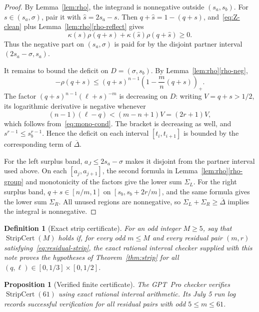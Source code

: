 \documentclass[11pt]{article}
\newtheorem{proposition}[theorem]{Proposition}
\newtheorem{definition}[theorem]{Definition}
\begin{document}
\begin{proof}
By Lemma~\ref{lem:rho}, the integrand is nonnegative outside $(s_a,s_b)$.  For $s\in(s_a,\sigma)$, pair it with $\widehat s=2s_a-s$.  Then $q+\widehat s=1-(q+s)$, and~\eqref{eq:Z-clean} plus Lemma~\ref{lem:rho}\ref{rho-reflect} gives
\[
        \kappa(s)\rho(q+s)+\kappa(\widehat s)\rho(q+\widehat s)\ge0.
\]
Thus the negative part on $(s_a,\sigma)$ is paid for by the disjoint partner interval $(2s_a-\sigma,s_a)$.

It remains to bound the deficit on $D=(\sigma,s_b)$.  By Lemma~\ref{lem:rho}\ref{rho-neg},
\[
        -\rho(q+s)\le(q+s)^{n-1}\left(1-\frac mn(q+s)\right)_+.
\]
The factor $(q+s)^{n-1}(\ell+s)^{-m}$ is decreasing on $D$: writing $V=q+s>1/2$, its logarithmic derivative is negative whenever
\[
        (n-1)(\ell-q)<(m-n+1)V=(2r+1)V,
\]
which follows from~\eqref{eq:mono-cond}.  The bracket is decreasing as well, and $s^{r-1}\le s_b^{r-1}$.  Hence the deficit on each interval $[t_i,t_{i+1}]$ is bounded by the corresponding term of $\overline\Delta$.

For the left surplus band, $a_J\le2s_a-\sigma$ makes it disjoint from the partner interval used above.  On each $[a_j,a_{j+1}]$, the second formula in Lemma~\ref{lem:rho}\ref{rho-group} and monotonicity of the factors give the lower sum $\Sigma_L$.  For the right surplus band, $q+s\in[n/m,1]$ on $[s_b,s_b+2r/m]$, and the same formula gives the lower sum $\Sigma_R$.  All unused regions are nonnegative, so $\Sigma_L+\Sigma_R\ge\overline\Delta$ implies the integral is nonnegative.
\end{proof}

\begin{definition}[Exact strip certificate]\label{def:cert}
For an odd integer $M\ge5$, say that $\operatorname{StripCert}(M)$ holds if, for every odd $m\le M$ and every residual pair $(m,r)$ satisfying~\eqref{eq:residual-strip}, the exact rational interval checker supplied with this note proves the hypotheses of Theorem~\ref{thm:strip} for all $(q,\ell)\in[0,1/3]\times[0,1/2]$.
\end{definition}

\begin{proposition}[Verified finite certificate]\label{prop:M61}
The GPT~Pro checker verifies $\operatorname{StripCert}(61)$ using exact rational interval arithmetic.  Its July 5 run log records successful verification for all residual pairs with odd $5\le m\le61$.
\end{proposition}
\end{document}

